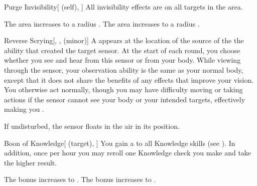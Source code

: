 \lowercase{\hypertarget{spell:Purge Invisibility}{}}\label{spell:Purge Invisibility}
\begin{attuneability}[Rank 3]{\hypertarget{spell:Purge Invisibility}{Purge Invisibility}}[ (self), ]
All invisibility effects are  on all targets in the area.

\rankline
{} The area increases to a \areahuge radius .
 The area increases to a \areaext radius .
\end{attuneability}
\vspace{0.25em}



\lowercase{\hypertarget{spell:Reverse Scrying}{}}\label{spell:Reverse Scrying}
\begin{freeability}[Rank 3]{\hypertarget{spell:Reverse Scrying}{Reverse Scrying}}[, ,  (minor)]
A  appears at the location of the source of the the ability that created the target sensor.
At the start of each round, you choose whether you see and hear from this sensor or from your body.
While viewing through the sensor, your observation ability is the same as your normal body, except that it does not share the benefits of any  effects that improve your vision.
You otherwise act normally, though you may have difficulty moving or taking actions if the sensor cannot see your body or your intended targets, effectively making you \blinded.

If undisturbed, the sensor floats in the air in its position.
\end{freeability}
\vspace{0.25em}



\lowercase{\hypertarget{spell:Boon of Knowledge}{}}\label{spell:Boon of Knowledge}
\begin{attuneability}[Rank 4]{\hypertarget{spell:Boon of Knowledge}{Boon of Knowledge}}[ (target), ]
You gain a   to all Knowledge skills (see ).
In addition, once per hour you may reroll one Knowledge check you make and take the higher result.

\rankline
{} The bonus increases to .
 The bonus increases to .
\end{attuneability}
\vspace{0.25em}



